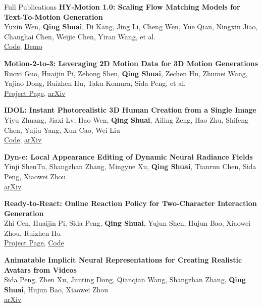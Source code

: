 \documentclass{resume}
\begin{document}
\begin{rSection}{Full Publications}
    {\bf HY-Motion 1.0: Scaling Flow Matching Models for Text-To-Motion Generation}\hfill{ } \\
    Yuxin Wen, \textbf{Qing Shuai}, Di Kang, Jing Li, Cheng Wen, Yue Qian, Ningxin Jiao, Changhai Chen, Weijie Chen, Yiran Wang, et al.\\
    \href{https://github.com/Tencent-Hunyuan/HY-Motion-1.0}{Code}, \href{https://huggingface.co/spaces/tencent/HY-Motion-1.0}{Demo}

    {\bf Motion-2-to-3: Leveraging 2D Motion Data for 3D Motion Generations}\hfill{ } \\
    Ruoxi Guo, Huaijin Pi, Zehong Shen, \textbf{Qing Shuai}, Zechen Hu, Zhumei Wang, Yajiao Dong, Ruizhen Hu, Taku Komura, Sida Peng, et al.\\
    \href{https://zju3dv.github.io/Motion-2-to-3/}{Project Page}, \href{https://arxiv.org/abs/2412.13111}{arXiv}

    {\bf IDOL: Instant Photorealistic 3D Human Creation from a Single Image}\hfill{ } \\
    Yiyu Zhuang, Jiaxi Lv, Hao Wen, \textbf{Qing Shuai}, Ailing Zeng, Hao Zhu, Shifeng Chen, Yujiu Yang, Xun Cao, Wei Liu\\
    \href{https://github.com/yiyuzhuang/IDOL}{Code}, \href{https://arxiv.org/abs/2412.14963}{arXiv}

    {\bf Dyn-e: Local Appearance Editing of Dynamic Neural Radiance Fields}\hfill{ } \\
    Yinji ShenTu, Shangzhan Zhang, Mingyue Xu, \textbf{Qing Shuai}, Tianrun Chen, Sida Peng, Xiaowei Zhou\\
    \href{https://arxiv.org/abs/2307.12909}{arXiv}

    {\bf Ready-to-React: Online Reaction Policy for Two-Character Interaction Generation}\hfill{ } \\
    Zhi Cen, Huaijin Pi, Sida Peng, \textbf{Qing Shuai}, Yujun Shen, Hujun Bao, Xiaowei Zhou, Ruizhen Hu\\
    \href{https://zju3dv.github.io/ready_to_react/}{Project Page}, \href{https://github.com/zju3dv/ready_to_react}{Code}

    {\bf Animatable Implicit Neural Representations for Creating Realistic Avatars from Videos}\hfill{ } \\
    Sida Peng, Zhen Xu, Junting Dong, Qianqian Wang, Shangzhan Zhang, \textbf{Qing Shuai}, Hujun Bao, Xiaowei Zhou\\
    \href{https://arxiv.org/abs/2203.08133}{arXiv}


\end{rSection}
\end{document}
